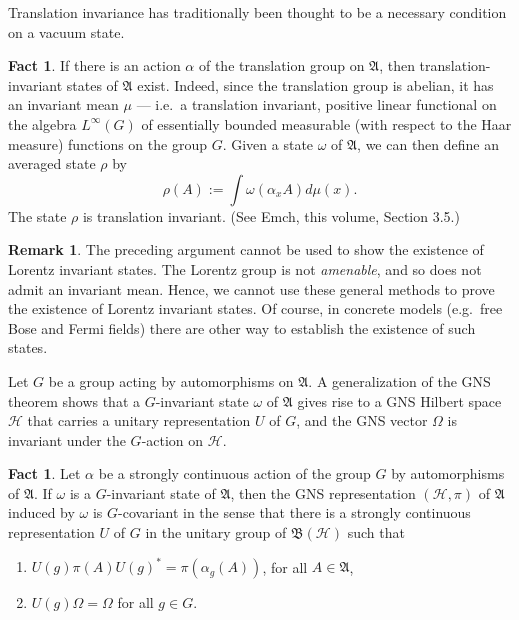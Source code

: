 \documentclass[12pt]{article}
\newcommand{\alg}[1]{\mathfrak{#1}}
\newcommand{\bh}{\mathfrak{B}(\mathcal{H})}
\theoremstyle{definition}
\newtheorem{fact}[thm]{Fact}
\theoremstyle{definition}
\newtheorem{note}[thm]{Remark}
\theoremstyle{remark}
\def\2#1{{\mathcal #1}}
\def\al#1{{\mathfrak #1}}
\def\a{\alpha} \def\b{\beta} \def\g{\gamma} \def\d{\delta}
\def\om{\omega} \def\Om{\Omega} \def\dd{\partial} \def\D{\Delta}
\begin{document}
Translation invariance has traditionally been thought to be a necessary condition on
a vacuum state.

\begin{fact} If there is an action $\a$ of the translation group on
  $\al A$, then translation-invariant states of $\al A$ exist.
  Indeed, since the translation group is abelian, it has an invariant
  mean $\mu$ --- i.e.\ a translation invariant, positive linear
  functional on the algebra $L^{\infty}(G)$ of essentially bounded
  measurable (with respect to the Haar measure) functions on the group
  $G$.  Given a state $\om$ of $\al A$, we can then define an averaged
  state $\rho$ by
$$ \rho (A):=\int \om (\a _xA)d\mu (x) .$$ 
The state $\rho$ is translation invariant.  (See Emch,
this volume, Section 3.5.)
\end{fact}

\begin{note} The preceding argument cannot be used to show the
  existence of Lorentz invariant states.  The Lorentz group is not
  \emph{amenable}, and so does not admit an invariant mean.  Hence, we
  cannot use these general methods to prove the existence of Lorentz
  invariant states.  Of course, in concrete models (e.g.\ free Bose
  and Fermi fields) there are other way to establish the existence of
  such states.
\end{note}


Let $G$ be a group acting by automorphisms on $\alg{A}$.  A
generalization of the GNS theorem shows that a $G$-invariant state
$\om$ of $\alg{A}$ gives rise to a GNS Hilbert space $\2H$ that
carries a unitary representation $U$ of $G$, and the GNS vector $\Om$
is invariant under the $G$-action on $\2H$.

\begin{fact} Let $\a$ be a strongly continuous action of the group $G$
  by automorphisms of $\alg{A}$.  If $\om$ is a $G$-invariant state of
  $\alg{A}$, then the GNS representation $(\2H ,\pi )$ of $\alg{A}$
  induced by $\om$ is $G$-covariant in the sense that there is a
  strongly continuous representation $U$ of $G$ in the unitary group
  of $\bh$ such that
  \begin{enumerate}
  \item $U(g)\pi (A)U(g)^* =\pi (\a _g(A))$, for all $A\in \alg{A}$,
  \item $U(g)\Om =\Om$ for all $g\in G$.
\end{enumerate} \label{unitary}
\end{fact}
\end{document}

